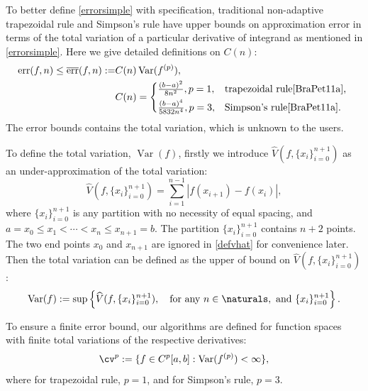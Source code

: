 \documentclass{iitthesis}
\DeclareMathOperator{\Var}{Var}
\theoremstyle{definition}
\theoremstyle{remark}
\begin{document}
To better define \eqref{errorsimple} with specification, traditional non-adaptive trapezoidal rule and Simpson's rule have upper bounds on approximation error in terms of the total variation of a particular derivative of integrand as mentioned in \eqref{errorsimple}. Here we give detailed definitions on $C(n)$:
\begin{align}\label{errorbound}
    \text{err}(f,n)\le\overline{\text{err}}(f,n):=&C(n)\Var(f^{(p)}),\\
    \nonumber&C(n)=
    \begin{cases*}
           \frac{(b-a)^2}{8n^2}, p=1,  & \mbox{trapezoidal rule}\cite[(7.15)]{BraPet11a}, \\
           \frac{(b-a)^4}{5832n^4}, p=3, & \mbox{Simpson's rule}\cite[(p.231)]{BraPet11a}.
    \end{cases*}
\end{align}
The error bounds contains the total variation, which is unknown to the users.

To define the total variation, $\Var(f)$, firstly we introduce $\widehat{V}(f,\{x_i\}_{i=0}^{n+1})$ as an under-approximation of the total variation:
\begin{equation}\label{defvhat}
    \widehat{V}(f,\{x_i\}_{i=0}^{n+1})=\sum_{i=1}^{n-1}|f(x_{i+1})-f(x_{i})|,
\end{equation}
where $\{x_i\}_{i=0}^{n+1}$ is any partition with no necessity of equal spacing, and $a=x_{0}\leq x_{1}<\cdots<x_{n}\leq x_{n+1}=b$.
The partition $\{x_i\}_{i=0}^{n+1}$ contains $n+2$ points. The two end points $x_0$ and $x_{n+1}$ are ignored in \eqref{defvhat} for convenience later.
Then the total variation can be defined as the upper of bound on $\widehat{V}(f,\{x_i\}_{i=0}^{n+1})$:
\begin{equation}\label{defvar}
  \Var(f) := \sup \left\{\widehat{V}(f,\{x_i\}_{i=0}^{n+1}), \quad \text{for any }n \in \naturals, \text{ and } \{x_i\}_{i=0}^{n+1}\right\}.
\end{equation}

To ensure a finite error bound, our algorithms are defined for function spaces with finite total variations of the respective derivatives:
\begin{equation}\label{defspace}
 \cv^{p}:=\{f\in C^{p}[a,b]: \Var(f^{(p)}) < \infty \},
\end{equation}
where for trapezoidal rule, $p=1$, and for Simpson's rule, $p=3$.
\end{document}
